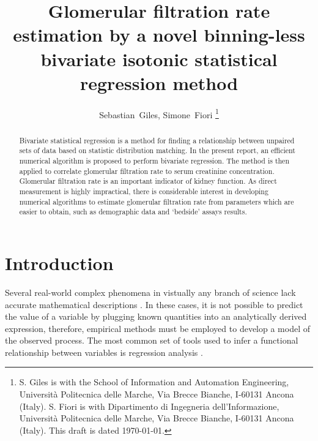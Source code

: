 \documentclass[10pt,final]{siamltex}
\begin{document}
\title{Glomerular filtration rate estimation by a novel binning-less bivariate isotonic statistical regression method}
\author{Sebastian~Giles, Simone~Fiori%
\thanks{S. Giles is with the School of Information and Automation Engineering,
Universit\`{a} Politecnica delle Marche,
Via Brecce Bianche, I-60131 Ancona (Italy).
\newline\indent
S. Fiori is with Dipartimento di Ingegneria dell'Informazione,
Universit\`{a} Politecnica delle Marche,
Via Brecce Bianche, I-60131 Ancona (Italy).
\newline\indent
This draft is dated \today.}}
\maketitle
\def\bbbr{\mathbb{R}}
\def\bbbx{\mathbb{X}}
\def\bbby{\mathbb{Y}}
\def\mdef{{\stackrel{{\mathrm{def}}}{=}}}
\renewcommand*{\thefootnote}{\fnsymbol{footnote}}
\def\to{\mathbf{\ to\ }}
\setcounter{footnote}{1}
%
%
\begin{abstract}
Bivariate statistical regression is a method for finding a relationship between unpaired sets of data based on statistic distribution matching. In the present report, an efficient numerical algorithm is proposed to perform bivariate regression. The method is then applied to correlate glomerular filtration rate to serum creatinine concentration. Glomerular filtration rate is an important indicator of kidney function. As direct measurement is highly impractical, there is considerable interest in developing numerical algorithms to estimate glomerular filtration rate from parameters which are easier to obtain, such as demographic data and `bedside' assays results.
\end{abstract}
%
\section{Introduction}\label{intro}
Several real-world complex phenomena in vistually any branch of science lack accurate mathematical descriptions \cite{seismic,strontium}. In these cases, it is not possible to predict the value of a variable by plugging known quantities into an analytically derived expression, therefore, empirical methods must be employed to develop a model of the observed process. The most common set of tools used to infer a functional relationship between variables is regression analysis \cite{control, ts}.

\end{document}
